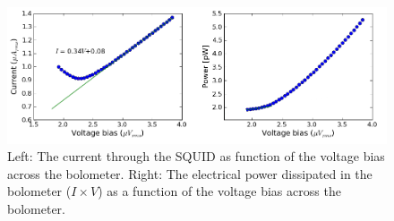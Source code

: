 \begin{figure}[htbp]
\begin{center}
\includegraphics[width=0.99\columnwidth]{figures/IV_201007301208.png} 
\caption{Left: The current through the \ac{SQUID} as function of the voltage bias across the bolometer. Right: The electrical power dissipated in the bolometer ($I \times V$) as a function of the voltage bias across the bolometer.
\label{fig:bolo_iv_curve} }
\end{center}
\end{figure}





